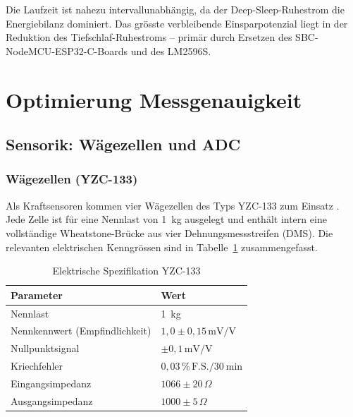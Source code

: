 \documentclass[12pt,a4paper]{article}
\begin{document}
	Die Laufzeit ist nahezu intervallunabhängig, da der Deep-Sleep-Ruhestrom die Energiebilanz dominiert.
	Das grösste verbleibende Einsparpotenzial liegt in der Reduktion des Tiefschlaf-Ruhestroms -- primär durch Ersetzen des SBC-NodeMCU-ESP32-C-Boards und des LM2596S.
	

	\section{Optimierung Messgenauigkeit}

	\subsection{Sensorik: Wägezellen und ADC}

	\subsubsection{Wägezellen (YZC-133)}

	Als Kraftsensoren kommen vier Wägezellen des Typs YZC-133 zum Einsatz \cite{yzc133_datasheet}.
	Jede Zelle ist für eine Nennlast von \SI{1}{\kilogram} ausgelegt und enthält intern eine vollständige Wheatstone-Brücke aus vier Dehnungsmessstreifen (DMS).
	Die relevanten elektrischen Kenngrössen sind in Tabelle~\ref{tab:yzc133} zusammengefasst.

	\begin{table}[h]
		\centering
		\caption{Elektrische Spezifikation YZC-133}
		\label{tab:yzc133}
		\begin{tabular}{@{}ll@{}}
			\toprule
			Parameter & Wert \\ \midrule
			Nennlast                & \SI{1}{\kilogram} \\
			Nennkennwert (Empfindlichkeit) & $1{,}0 \pm 0{,}15\,\text{mV/V}$ \\
			Nullpunktsignal         & $\pm 0{,}1\,\text{mV/V}$ \\
			Kriechfehler            & $0{,}03\,\%\,\text{F.S.} / \SI{30}{\minute}$ \\
			Eingangsimpedanz        & $1066 \pm 20\,\Omega$ \\
			Ausgangsimpedanz        & $1000 \pm 5\,\Omega$ \\ \bottomrule
		\end{tabular}
	\end{table}
\end{document}
